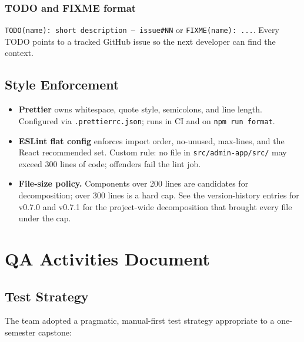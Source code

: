 \documentclass[11pt,letterpaper]{article}
\begin{document}
\subsubsection*{TODO and FIXME format}

\texttt{TODO(name): short description -- issue\#NN} or
\texttt{FIXME(name): ...}. Every TODO points to a tracked
GitHub issue so the next developer can find the context.

\subsection{Style Enforcement}

\begin{itemize}[noitemsep]
  \item \textbf{Prettier} owns whitespace, quote style, semicolons,
        and line length. Configured via \texttt{.prettierrc.json};
        runs in CI and on \texttt{npm run format}.
  \item \textbf{ESLint flat config} enforces import order, no-unused,
        max-lines, and the React recommended set. Custom rule:
        no file in \texttt{src/admin-app/src/} may exceed 300 lines
        of code; offenders fail the lint job.
  \item \textbf{File-size policy.} Components over 200 lines are
        candidates for decomposition; over 300 lines is a hard cap.
        See the version-history entries for v0.7.0 and v0.7.1 for
        the project-wide decomposition that brought every file
        under the cap.
\end{itemize}

\newpage

\section{QA Activities Document}

\subsection{Test Strategy}

The team adopted a pragmatic, manual-first test strategy
appropriate to a one-semester capstone:
\end{document}
